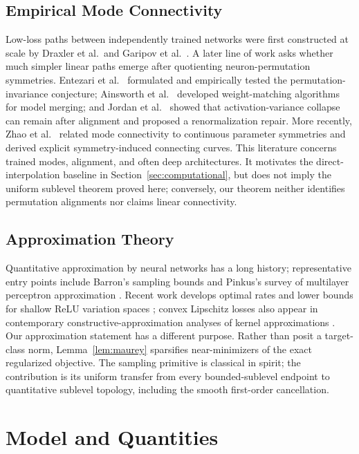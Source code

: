 \documentclass[smallextended,envcountsect]{svjour3}
\begin{document}
\subsection{Empirical Mode Connectivity}
Low-loss paths between independently trained networks were first constructed at scale by Draxler et al.\ and Garipov et al.\ \cite{Draxler2018,Garipov2018}. A later line of work asks whether much simpler linear paths emerge after quotienting neuron-permutation symmetries. Entezari et al.\ \cite{Entezari2022} formulated and empirically tested the permutation-invariance conjecture; Ainsworth et al.\ \cite{Ainsworth2023} developed weight-matching algorithms for model merging; and Jordan et al.\ \cite{Jordan2023} showed that activation-variance collapse can remain after alignment and proposed a renormalization repair. More recently, Zhao et al.\ \cite{Zhao2025} related mode connectivity to continuous parameter symmetries and derived explicit symmetry-induced connecting curves. This literature concerns trained modes, alignment, and often deep architectures. It motivates the direct-interpolation baseline in Section~\ref{sec:computational}, but does not imply the uniform sublevel theorem proved here; conversely, our theorem neither identifies permutation alignments nor claims linear connectivity.

\subsection{Approximation Theory}
Quantitative approximation by neural networks has a long history; representative entry points include Barron's sampling bounds \cite{Barron1993} and Pinkus's survey of multilayer perceptron approximation \cite{Pinkus1999}. Recent work develops optimal rates and lower bounds for shallow ReLU variation spaces \cite{YangZhou2025,Siegel2025}; convex Lipschitz losses also appear in contemporary constructive-approximation analyses of kernel approximations \cite{Lian2026}. Our approximation statement has a different purpose. Rather than posit a target-class norm, Lemma~\ref{lem:maurey} sparsifies near-minimizers of the exact regularized objective. The sampling primitive is classical in spirit; the contribution is its uniform transfer from every bounded-sublevel endpoint to quantitative sublevel topology, including the smooth first-order cancellation.

\section{Model and Quantities}\label{sec:setting}
\end{document}
